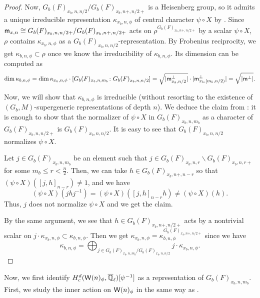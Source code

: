 \documentclass[12pt,reqno]{amsart}
\begin{document}
\begin{proof}
    Now, $G_b(F)_{x_b, n, n/2} / G_b(F)_{x_b, n+, n/2+}$ is a Heisenberg group, so it admits a unique irreducible representation $\kappa_{x_b, n, \phi}$ of central character $\psi \circ X$ by \cite[Lemma 1.2]{Ger77}. Since ${\mathsf{m}}_{x, n}  \cong G_b(F)_{x_b, n, n/2+} / G_b(F)_{x_b, n+, n/2+}$ acts on $\rho^{G_b(F)_{x_b, n+, n/2+}}$ by a scalar $\psi \circ X$, $\rho$ contains $\kappa_{x_b, n, \phi}$ as a $G_b(F)_{x_b, n, n/2}$-representation. By Frobenius reciprocity, we get $\kappa_{b, n, \phi} \subset \rho$ once we know the irreducibility of $\kappa_{b, n, \phi}$. Its dimension can be computed as
    \[  
        \dim \kappa_{b, n, \phi} = \dim \kappa_{x_b, n, \phi} \cdot [G_b(F)_{x_b, n, m_b} \colon G_b(F)_{x_b, n, n/2}] = \sqrt{\lvert {\mathsf{m}}^\perp_{x_b, n/2} \rvert} \cdot \lvert {\mathsf{m}}^\perp_{x_b, [m_b, n/2)} \rvert = \sqrt{\lvert {\mathsf{m}}^\perp \rvert}. 
    \]

    Now, we will show that $\kappa_{b, n, \phi}$ is irreducible (without resorting to the existence of $(G_b, M)$-supergeneric representations of depth $n$). We deduce the claim from \cite[Lemma 6.3.1]{BW16}: it is enough to show that the normalizer of $\psi \circ X$ in $G_b(F)_{x_b, n, m_b}$ as a character of $G_b(F)_{x_b, n, n/2+}$ is $G_b(F)_{x_b, n, n/2}$. It is easy to see that $G_b(F)_{x_b, n, n/2}$ normalizes $\psi \circ X$.
    
    Let $j \in G_b(F)_{x_b, n, m_b}$ be an element such that $j \in G_b(F)_{x_b, n, r} \backslash G_b(F)_{x_b, n, r+}$ for some $m_b \leq r < \tfrac{n}{2}$. Then, we can take $h \in G_b(F)_{x_b, n+, n - r}$ so that $(\psi \circ X)([j, h]_{n-r}) \neq 1$, and we have
    \[
        (\psi \circ X)(j h j^{-1}) = (\psi \circ X)([j, h]_{n-r} h) \neq (\psi \circ X)(h).
    \]
    Thus, $j$ does not normalize $\psi \circ X$ and we get the claim. 

    By the same argument, we see that $h \in G_b(F)_{x_b, n+, n/2+}$ acts by a nontrivial scalar on $j \cdot \kappa_{x_b, n, \phi} \subset \kappa_{b, n, \phi}$. Then we get $\kappa_{x_b, n, \phi} = \kappa_{b, n, \phi}^{G_b(F)_{x_b, n+, n/2+}}$ since we have
    \[
        \kappa_{b, n, \phi} = \bigoplus_{j \in G_b(F)_{x_b, n, m_b} / G_b(F)_{x_b, n, n/2}} j \cdot \kappa_{x_b, n, \phi}.  
    \]
\end{proof}

Now, we first identify $H_c^d({\mathsf{W}}(n)_\phi, {\overline{\mathbb{Q}}_\ell})[\psi^{-1}]$ as a representation of $G_b(F)_{x_b, n, m_b}$. First, we study the inner action on ${\mathsf{W}}(n)_\phi$ in the same way as . 
\end{document}
